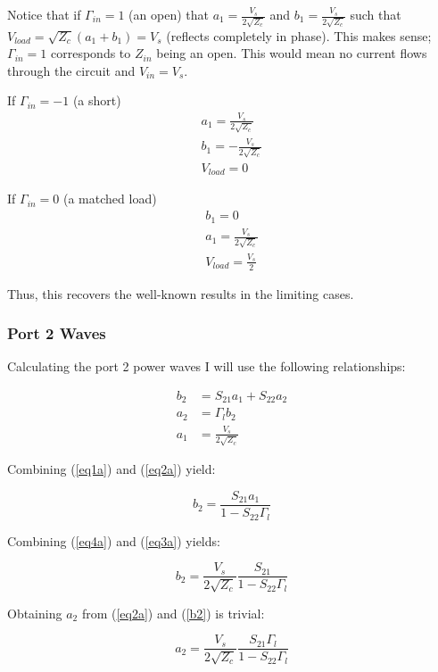 Notice that if $\Gamma_{in} = 1$ (an open) that 
$a_1 = \frac{V_s}{2 \sqrt{Z_c}}$
and 
$b_1 = \frac{V_s}{2 \sqrt{Z_c}}$ such
that 
$V_{load} = \sqrt{Z_c} (a_1+b_1) = V_s$ (reflects completely in phase). This
makes sense; $\Gamma_{in} = 1$ corresponds to $Z_{in}$ being an open. This would
mean no current flows through the circuit and $V_{in} = V_s$.

If $\Gamma_{in} = -1$ (a short)
\begin{gather*}
    a_1 = \frac{V_s }{2\sqrt{Z_c}} \\
    b_1 = -\frac{V_s}{2\sqrt{Z_c}} \\
    V_{load} = 0
\end{gather*}

If $\Gamma_{in} = 0$ (a matched load)
\begin{gather*}
    b_1 = 0 \\
    a_1 = \frac{V_s}{2 \sqrt{Z_c}} \\
    V_{load} = \frac{V_s }{2}
\end{gather*}

Thus, this recovers the well-known results in the limiting cases.
\subsubsection{Port 2 Waves}
Calculating the port 2 power waves I will use the following relationships:

\begin{align}
    b_2 &= S_{21}a_1 + S_{22}a_2 \label{eq1a}\\
    a_2 &= \Gamma_l b_2 \label{eq2a} \\
    a_1 &= \frac{V_s}{2 \sqrt{Z_c}} \label{eq3a}
\end{align}

Combining (\ref{eq1a}) and (\ref{eq2a}) yield:

\begin{equation}
b_2 = \frac{S_{21}a_1}{1-S_{22}\Gamma_l} \label{eq4a}
\end{equation}

Combining (\ref{eq4a}) and (\ref{eq3a}) yields:

\begin{equation}
    b_2 =  \frac{V_s}{2 \sqrt{Z_c}}\frac{S_{21}}{1-S_{22}\Gamma_l} \label{b2}
\end{equation}

Obtaining $a_2$ from (\ref{eq2a}) and (\ref{b2}) is trivial:

\begin{equation}
    a_2 = \frac{V_s}{2 \sqrt{Z_c}}\frac{S_{21}\Gamma_l}{1-S_{22}\Gamma_l} \label{a2}
\end{equation}

